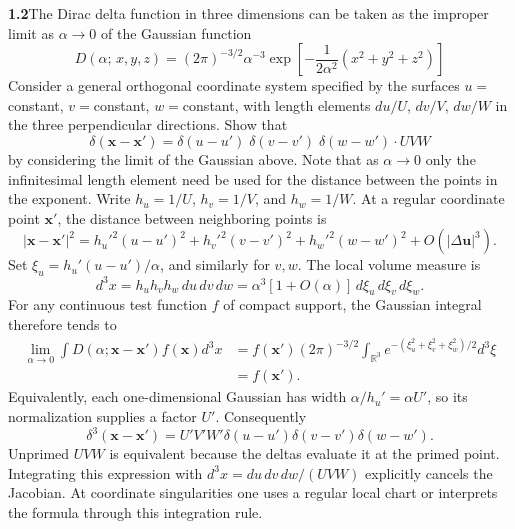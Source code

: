 \par\bigskip
\noindent\textbf{1.2}\quad The Dirac delta function in three dimensions can be taken as the improper limit as $\alpha \rightarrow 0$ of the Gaussian function
\[
D(\alpha;\,x,y,z) = (2\pi)^{-3/2}\alpha^{-3}\exp\left[-\frac{1}{2\alpha^{2}}\left(x^{2}+y^{2}+z^{2}\right)\right]
\]
Consider a general orthogonal coordinate system specified by the surfaces $u = {}$constant, $v = {}$constant, $w = {}$constant, with length elements $du/U$, $dv/V$, $dw/W$ in the three perpendicular directions. Show that
\[
\delta(\mathbf{x}-\mathbf{x}') = \delta(u-u')\;\delta(v-v')\;\delta(w-w')\cdot UVW
\]
by considering the limit of the Gaussian above. Note that as $\alpha \rightarrow 0$ only the infinitesimal length element need be used for the distance between the points in the exponent.
\solution
Write $h_u=1/U$, $h_v=1/V$, and $h_w=1/W$. At a regular coordinate point
$\mathbf x'$, the distance between neighboring points is
\[
|\mathbf x-\mathbf x'|^2
=h_u'^2(u-u')^2+h_v'^2(v-v')^2+h_w'^2(w-w')^2+O(|\Delta\mathbf u|^3).
\]
Set $\xi_u=h_u'(u-u')/\alpha$, and similarly for $v,w$. The local volume
measure is
\[
d^3x=h_uh_vh_w\,du\,dv\,dw
=\alpha^3[1+O(\alpha)]\,d\xi_u\,d\xi_v\,d\xi_w.
\]
For any continuous test function $f$ of compact support, the Gaussian integral
therefore tends to
\[
\begin{split}
\lim_{\alpha\to0}\int D(\alpha;\mathbf x-\mathbf x')f(\mathbf x)d^3x
&=f(\mathbf x')(2\pi)^{-3/2}
\int_{\mathbb R^3}e^{-(\xi_u^2+\xi_v^2+\xi_w^2)/2}d^3\xi\\
&=f(\mathbf x').
\end{split}
\]
Equivalently, each one-dimensional Gaussian has width
$\alpha/h_u'=\alpha U'$, so its normalization supplies a factor $U'$.
Consequently
\[
\boxed{\delta^3(\mathbf x-\mathbf x')
=U'V'W'\delta(u-u')\delta(v-v')\delta(w-w').}
\]
Unprimed $UVW$ is equivalent because the deltas evaluate it at the primed
point. Integrating this expression with $d^3x=du\,dv\,dw/(UVW)$ explicitly
cancels the Jacobian. At coordinate singularities one uses a regular local
chart or interprets the formula through this integration rule.


